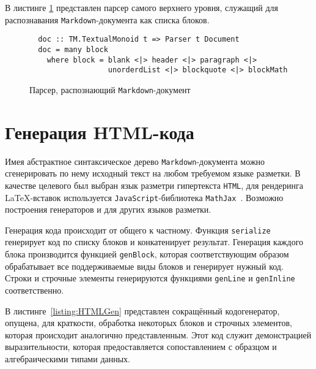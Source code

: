   В листинге \ref{listing:MarkdownDoc} представлен парсер самого верхнего уровня,
  служащий для распознавания \lstinline{Markdown}-документа как списка блоков.

  \begin{figure}[h]
  \begin{lstlisting}
  doc :: TM.TextualMonoid t => Parser t Document
  doc = many block
    where block = blank <|> header <|> paragraph <|>
                  unorderdList <|> blockquote <|> blockMath
  \end{lstlisting}
  \caption{Парсер, распознающий \lstinline{Markdown}-документ}
  \label{listing:MarkdownDoc}
  \end{figure}

\section{Генерация HTML-кода}

  Имея абстрактное синтаксическое дерево \lstinline{Markdown}-документа можно
  сгенерировать по нему исходный текст на любом требуемом языке разметки.
  В качестве целевого был выбран язык разметри гипертекста \lstinline{HTML}, для рендеринга
  \LaTeX-вставок используется \lstinline{JavaScript}-библиотека
  \lstinline{MathJax}~\cite{mathJax}. Возможно построения генераторов и для
  других языков разметки.

  Генерация кода происходит от общего к частному. Функция \lstinline{serialize}
  генерирует код по списку блоков и конкатенирует результат. Генерация каждого
  блока производится функцией \lstinline{genBlock}, которая соответствующим
  образом обрабатывает все поддерживаемые виды блоков и генерирует нужный код.
  Строки и строчные элементы генерируются функциями \lstinline{genLine} и
  \lstinline{genInline} соответственно.

  В листинге~\ref{listing:HTMLGen} представлен сокращённый кодогенератор, опущена,
  для краткости, обработка некоторых блоков и строчных элементов, которая
  происходит аналогично представленным. Этот код служит демонстрацией
  выразительности, которая предоставляется сопоставлением с образцом и
  алгебраическими типами данных.

